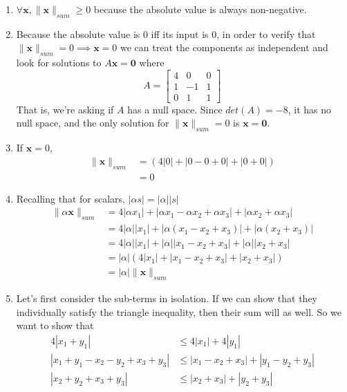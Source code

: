 \documentclass[]{article}
\newcommand{\bbm}{\begin{bmatrix}}
\newcommand{\ebm}{\end{bmatrix}}
\newcommand\nsum[1]{\| #1 \|_{sum}}
\begin{document}
\begin{enumerate}[resume]
\begin{enumerate}
	      \begin{enumerate}
          \item $\forall \bm{x}, \nsum{\bm{x}} \geq 0$ because the
            absolute value is always non-negative.
          \item Because the absolute value is 0 iff its input is 0, in
            order to verify that $\nsum{\bm{x}} = 0 \implies \bm{x} =
            0$ we can treat the components as independent and look for
            solutions to $A \bm{x} = \bm{0}$ where
            \[
            A = \bbm
            4 & 0 & 0 \\
            1 & -1 & 1 \\
            0 & 1 & 1
            \ebm
            \]
            That is, we're asking if $A$ has a null space. Since
            $det(A) = -8$, it has no null space, and the only solution
            for $\nsum{\bm{x}} = 0$ is $\bm{x} = \bm{0}$.
            
          \item If $\bm{x} = 0$,
            \[
            \begin{split}
              \nsum{\bm{x}} &= (4|0| + |0 - 0 + 0| + |0 + 0|) \\
              &= 0
            \end{split}
            \]

          \item Recalling that for scalars, $|\alpha s| = |\alpha| |s|$
            \[ \begin{split}
              \nsum{\alpha \bm{x}} &= 4|\alpha x_1| + |\alpha x_1 - \alpha x_2 + \alpha x_3| + |\alpha x_2 + \alpha x_3| \\
              &= 4|\alpha||x_1| + |\alpha (x_1 - x_2 + x_3)| + |\alpha (x_2 + x_3)| \\
              &= 4|\alpha||x_1| + |\alpha| |x_1 - x_2 + x_3| + |\alpha| |x_2 + x_3| \\
              &= |\alpha| (4|x_1| + |x_1 - x_2 + x_3| + |x_2 + x_3|) \\
              &= |\alpha| \nsum{\bm{x}}
            \end{split} \]

          \item
            Let's first consider the sub-terms in isolation. If we can show that they individually satisfy the triangle inequality, then their sum will as well. So we want to show that
            \begin{align}
              4|x_1 + y_1| & \leq 4|x_1| + 4|y_1| \label{sub1} \\
              |x_1 + y_1 - x_2 - y_2 + x_3 + y_3| & \leq |x_1 - x_2 + x_3| + |y_1 - y_2 + y_3| \label{sub2} \\
              |x_2 + y_2 + x_3 + y_3| & \leq |x_2 + x_3| + |y_2 + y_3| \label{sub3} 
            \end{align}


\end{enumerate}
\end{enumerate}
\end{enumerate}
\end{document}
